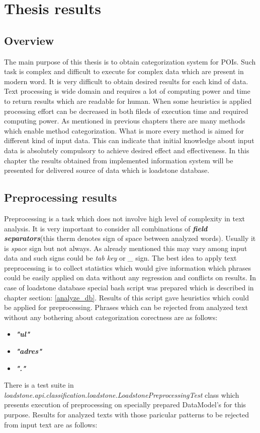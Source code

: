 \chapter{Thesis results}

\section{Overview}
The main purpose of this thesis is to obtain categorization system for POIs. Such task is complex and difficult to execute for complex data which are present in modern word. It is very difficult to obtain desired results for each kind of data. Text processing is wide domain and requires a lot of computing power and time to return results which are readable for human. When some heuristics is applied processing effort can be decreased in both fileds of execution time and required computing power. As mentioned in previous chapters there are many methods which enable method categorization. What is more every method is aimed for different kind of input data. This can indicate that initial knowledge about input data is absolutely compulsory to achieve desired effect and effectiveness. In this chapter the results obtained from implemented information system will be presented for delivered source of data which is loadstone database.

\section{Preprocessing results}
Preprocessing is a task which does not involve high level of complexity in text analysis. It is very important to consider all combinations of \textit{\textbf{field separators}}(this therm denotes sign of space between analyzed words). Usually it is \textit{space} sign but not always. As already mentioned this may vary among input data and such signs could be \textit{tab key} or \textit{\_} sign. The best idea to apply text preprocessing is to collect statistics which would give information which phrases could be easily applied on data without any regression and conflicts on results. In case of loadstone database special bash script was prepared which is described in chapter section: \ref{analyze_db}. Results of this script gave heuristics which could be applied for preprocessing.
Phrases which can be rejected from analyzed text without any bothering about categorization corectness are as follows:
\newline
\begin{itemize}
	\item \textbf{\textit{"ul"}}
	\item \textbf{\textit{"adres"}}
	\item \textbf{\textit{"."}}
\end{itemize}
There is a test suite in \textit{loadstone.api.classification.loadstone.LoadstonePreprocessingTest} class which presents execution of preprocessing on specially prepared DataModel's for this purpose. Results for analyzed texts with those paricular patterns to be rejected from input text are as follows:

